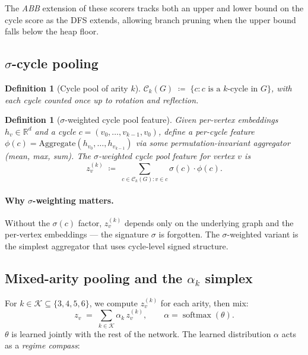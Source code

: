 \documentclass[11pt,a4paper]{article}
\newtheorem{definition}[theorem]{Definition}
\theoremstyle{remark}
\DeclareMathOperator{\softmax}{softmax}
\newcommand{\R}{\mathbb{R}}
\begin{document}
The \emph{ABB} extension of these scorers tracks both an upper
and lower bound on the cycle score as the DFS extends, allowing
branch pruning when the upper bound falls below the heap floor.

\subsection{$\sigma$-cycle pooling}

\begin{definition}[Cycle pool of arity $k$]
$\mathcal{C}_k(G) \;\coloneqq\; \{c : c \text{ is a $k$-cycle in } G\}$,
with each cycle counted once up to rotation and reflection.
\end{definition}

\begin{definition}[$\sigma$-weighted cycle pool feature]
Given per-vertex embeddings $h_v \in \R^d$ and a cycle
$c = (v_0, \dots, v_{k-1}, v_0)$, define a per-cycle feature
$\phi(c) = \mathrm{Aggregate}(h_{v_0}, \dots, h_{v_{k-1}})$ via
some permutation-invariant aggregator (mean, max, sum). The
\emph{$\sigma$-weighted cycle pool feature} for vertex $v$ is
\[
  z_v^{(k)} \;\coloneqq\; \sum_{c \in \mathcal{C}_k(G) : v \in c}
                            \sigma(c) \cdot \phi(c).
\]
\end{definition}

\paragraph{Why $\sigma$-weighting matters.}
Without the $\sigma(c)$ factor, $z_v^{(k)}$ depends only on the
underlying graph and the per-vertex embeddings --- the signature
$\sigma$ is forgotten. The $\sigma$-weighted variant is the
simplest aggregator that uses cycle-level signed structure.

\subsection{Mixed-arity pooling and the $\alpha_k$ simplex}

For $k \in \mathcal{K} \subseteq \{3, 4, 5, 6\}$, we compute
$z_v^{(k)}$ for each arity, then mix:
\[
  z_v \;=\; \sum_{k \in \mathcal{K}} \alpha_k \, z_v^{(k)},
  \qquad \alpha = \softmax(\theta).
\]
$\theta$ is learned jointly with the rest of the network. The
learned distribution $\alpha$ acts as a \emph{regime compass}:
\end{document}
